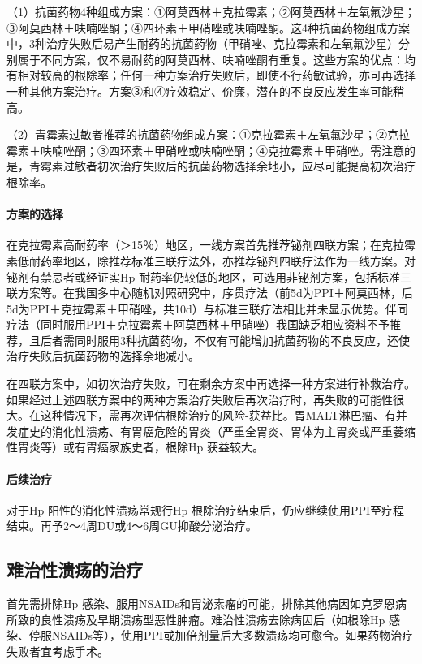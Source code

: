 （1）抗菌药物4种组成方案：①阿莫西林＋克拉霉素；②阿莫西林＋左氧氟沙星；③阿莫西林＋呋喃唑酮；④四环素＋甲硝唑或呋喃唑酮。这4种抗菌药物组成方案中，3种治疗失败后易产生耐药的抗菌药物（甲硝唑、克拉霉素和左氧氟沙星）分别属于不同方案，仅不易耐药的阿莫西林、呋喃唑酮有重复。这些方案的优点：均有相对较高的根除率；任何一种方案治疗失败后，即使不行药敏试验，亦可再选择一种其他方案治疗。方案③和④疗效稳定、价廉，潜在的不良反应发生率可能稍高。

（2）青霉素过敏者推荐的抗菌药物组成方案：①克拉霉素＋左氧氟沙星；②克拉霉素＋呋喃唑酮；③四环素＋甲硝唑或呋喃唑酮；④克拉霉素＋甲硝唑。需注意的是，青霉素过敏者初次治疗失败后的抗菌药物选择余地小，应尽可能提高初次治疗根除率。
\paragraph{方案的选择}

在克拉霉素高耐药率（＞15％）地区，一线方案首先推荐铋剂四联方案；在克拉霉素低耐药率地区，除推荐标准三联疗法外，亦推荐铋剂四联疗法作为一线方案。对铋剂有禁忌者或经证实{Hp}
耐药率仍较低的地区，可选用非铋剂方案，包括标准三联方案等。在我国多中心随机对照研究中，序贯疗法（前5d为PPI＋阿莫西林，后5d为PPI＋克拉霉素＋甲硝唑，共10d）与标准三联疗法相比并未显示优势。伴同疗法（同时服用PPI＋克拉霉素＋阿莫西林＋甲硝唑）我国缺乏相应资料不予推荐，且后者需同时服用3种抗菌药物，不仅有可能增加抗菌药物的不良反应，还使治疗失败后抗菌药物的选择余地减小。

在四联方案中，如初次治疗失败，可在剩余方案中再选择一种方案进行补救治疗。如果经过上述四联方案中的两种方案治疗失败后再次治疗时，再失败的可能性很大。在这种情况下，需再次评估根除治疗的风险-获益比。胃MALT淋巴瘤、有并发症史的消化性溃疡、有胃癌危险的胃炎（严重全胃炎、胃体为主胃炎或严重萎缩性胃炎等）或有胃癌家族史者，根除{Hp}
获益较大。
\paragraph{后续治疗}

对于{Hp} 阳性的消化性溃疡常规行{Hp}
根除治疗结束后，仍应继续使用PPI至疗程结束。再予2～4周DU或4～6周GU抑酸分泌治疗。

\subsection{难治性溃疡的治疗}

首先需排除{Hp}
感染、服用NSAIDs和胃泌素瘤的可能，排除其他病因如克罗恩病所致的良性溃疡及早期溃疡型恶性肿瘤。难治性溃疡去除病因后（如根除{Hp}
感染、停服NSAIDs等），使用PPI或加倍剂量后大多数溃疡均可愈合。如果药物治疗失败者宜考虑手术。

